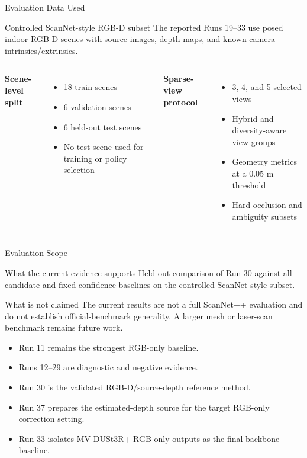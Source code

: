 \begin{frame}{Evaluation Data Used}
  \begin{block}{Controlled ScanNet-style RGB-D subset}
    The reported Runs 19--33 use posed indoor RGB-D scenes with source images,
    depth maps, and known camera intrinsics/extrinsics.
  \end{block}

  \vspace{0.18cm}
  \begin{columns}[T]
    \textbf{Scene-level split}
    \begin{itemize}
      \item 18 train scenes
      \item 6 validation scenes
      \item 6 held-out test scenes
      \item No test scene used for training or policy selection
    \end{itemize}

    \textbf{Sparse-view protocol}
    \begin{itemize}
      \item 3, 4, and 5 selected views
      \item Hybrid and diversity-aware view groups
      \item Geometry metrics at a 0.05 m threshold
      \item Hard occlusion and ambiguity subsets
    \end{itemize}
  \end{columns}
\end{frame}

\begin{frame}{Evaluation Scope}
  \begin{block}{What the current evidence supports}
    Held-out comparison of Run 30 against all-candidate and fixed-confidence
    baselines on the controlled ScanNet-style subset.
  \end{block}

  \vspace{0.18cm}
  \begin{alertblock}{What is not claimed}
    The current results are not a full ScanNet++ evaluation and do not establish
    official-benchmark generality. A larger mesh or laser-scan benchmark remains
    future work.
  \end{alertblock}

  \vspace{0.18cm}
  \begin{itemize}
    \item Run 11 remains the strongest RGB-only baseline.
    \item Runs 12--29 are diagnostic and negative evidence.
    \item Run 30 is the validated RGB-D/source-depth reference method.
    \item Run 37 prepares the estimated-depth source for the target RGB-only
    correction setting.
    \item Run 33 isolates MV-DUSt3R+ RGB-only outputs as the final backbone
    baseline.
  \end{itemize}
\end{frame}

